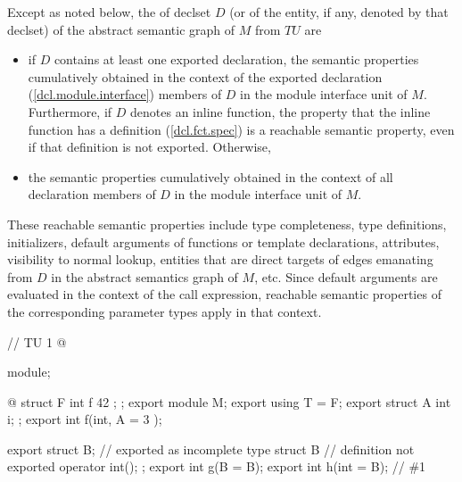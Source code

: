 \begin{std.txt}
  \alinea
  Except as noted below, the 
   of declset $D$
  (or of the entity, if any, denoted by that declset)
  of the abstract semantic graph of $M$ from $TU$ are 
  \begin{itemize}
    \item if $D$ contains at least one exported declaration, 
    the semantic properties cumulatively obtained in the context
    of the exported declaration (\ref{dcl.module.interface}) 
    members of $D$ in the module interface
    unit of $M$. Furthermore, if $D$ denotes an inline function,
    the property that the inline function has a definition
    (\ref{dcl.fct.spec}) is a reachable semantic property, even 
    if that definition is not exported. Otherwise,
    \item the semantic properties cumulatively obtained in the context of all
    declaration members of $D$ in the module interface unit of $M$.
  \end{itemize}
  \enternote
  These reachable semantic properties include type completeness, 
  type definitions, initializers,
  default arguments of functions or template declarations, attributes,
  visibility to normal lookup, entities that are direct targets of edges 
  emanating from $D$ in the abstract semantics graph of $M$, etc.
  Since default arguments are evaluated in the context of the call expression,
  reachable semantic properties of the corresponding parameter types apply in 
  that context. 
  \begin{example}
    \begin{codeblock}
      // TU 1
      @\begin{after}\color{addclr}
      module;
      \end{after}@
      struct F { int f { 42 }; };
      export module M;
      export using T = F;
      export struct A { int i; };
      export int f(int, A = { 3 });

      export struct B;      // exported as incomplete type
      struct B {            // definition not exported
        operator int();
      };
      export int g(B = B{});
      export int h(int = B{}); // \#1


\end{codeblock}
\end{example}
\end{std.txt}
